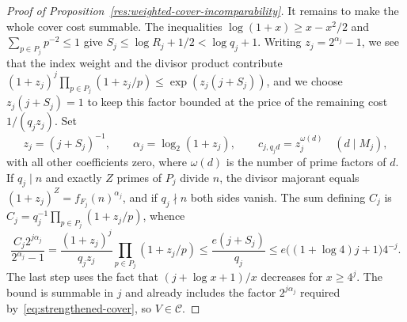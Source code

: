 \documentclass[11pt]{article}
\begin{document}
\begin{proof}[Proof of Proposition~\ref{res:weighted-cover-incomparability}]
It remains to make the whole cover cost summable. The inequalities
$\log(1+x)\ge x-x^2/2$ and $\sum_{p\in P_j}p^{-2}\le1$ give
$S_j\le\log R_j+1/2<\log q_j+1$. Writing $z_j=2^{\alpha_j}-1$, we see
that the index weight and the divisor product contribute
$(1+z_j)^j\prod_{p\in P_j}(1+z_j/p)\le\exp(z_j(j+S_j))$, and we choose
$z_j(j+S_j)=1$ to keep this factor bounded at the price of the
remaining cost $1/(q_jz_j)$. Set
\[
 z_j=(j+S_j)^{-1},\qquad
 \alpha_j=\log_2(1+z_j),\qquad
 c_{j,q_jd}=z_j^{\omega(d)}\quad(d\mid M_j),
\]
with all other coefficients zero, where $\omega(d)$ is the number of
prime factors of $d$. If $q_j\mid n$ and exactly $Z$ primes of $P_j$
divide $n$, the divisor majorant equals
$(1+z_j)^Z=f_{F_j}(n)^{\alpha_j}$, and if $q_j\nmid n$ both sides
vanish. The sum defining $C_j$ is
$C_j=q_j^{-1}\prod_{p\in P_j}(1+z_j/p)$, whence
\[
 \frac{C_j2^{j\alpha_j}}{2^{\alpha_j}-1}
 =\frac{(1+z_j)^j}{q_jz_j}
    \prod_{p\in P_j}(1+z_j/p)
 \le\frac{e(j+S_j)}{q_j}
 \le e\bigl((1+\log4)j+1\bigr)4^{-j}.
\]
The last step uses the fact that $(j+\log x+1)/x$ decreases for
$x\ge4^j$. The bound is summable in $j$ and already includes the
factor $2^{j\alpha_j}$ required by~\eqref{eq:strengthened-cover}, so
$V\in\mathcal C$.
\end{proof}
\end{document}
